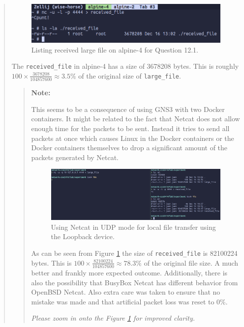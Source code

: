 \documentclass{article}
\newenvironment{ans}
{\fbox{Answer}\begin{quote}\nopagebreak}
{\end{quote}}
\newenvironment{note}{%
\begin{quote}
\begin{tcolorbox}[colback=gray!10,arc=0mm,boxrule=0pt]
\raggedright
\textbf{Note:}%
}{%
\end{tcolorbox}
\end{quote}%
}
\begin{document}
\begin{ans}
\begin{figure}[H]
\centering
\includegraphics[width=16cm]{data/q12-received-file.png}
\caption{Listing received large file on alpine-4 for Question 12.1.}
\end{figure}

The \texttt{received\_file} in alpine-4 has a size of
3678208 bytes. This is roughly $100 \times
\frac{3678208}{104857600} \approx 3.5\%$ of the original
size of \texttt{large\_file}.

\begin{note}
This seems to be a consequence of using GNS3 with two Docker containers.  It
might be related to the fact that Netcat does not allow enough time for the
packets to be sent. Instead it tries to send all packets at once which causes
Linux in the Docker containers or the Docker containers themselves to drop a
significant amount of the packets generated by Netcat.

\begin{figure}[H]
\centering
\includegraphics[width=13cm]{data/local-experiment.png}
\caption{Using Netcat in UDP mode for local file transfer using the Loopback
device.}
\label{fig:experiment}
\end{figure}

As can be seen from Figure \ref{fig:experiment} the size of
\texttt{received\_file} is 82100224 bytes. This is $100
\times \frac{82100224}{104857600} \approx 78.3\%$ of the
original file size. A much better and frankly more expected
outcome. Additionally, there is also the possibility that
BusyBox Netcat has different behavior from OpenBSD Netcat.
Also extra care was taken to ensure that no mistake was
made and that artificial packet loss was reset to 0\%.
\vspace{1em}
\begin{center}
\textit{Please zoom in onto the Figure \ref{fig:experiment} for improved
clarity.}
\end{center}
\end{note}


\end{ans}
\end{document}
